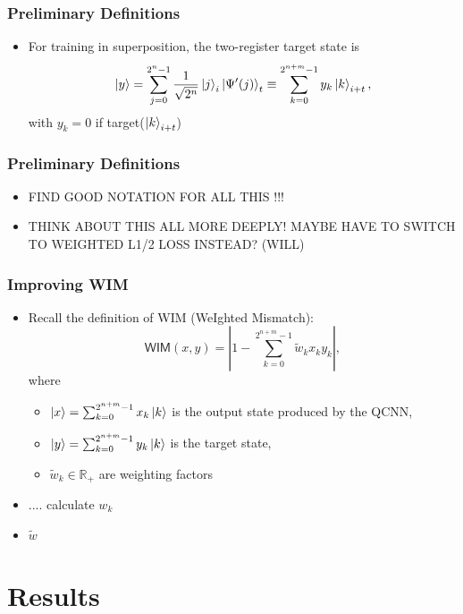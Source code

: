 \documentclass{beamer}
\begin{document}
\begin{frame}
\frametitle{Preliminary Definitions}
\begin{itemize}
\item For training in superposition, the two-register target state is 
\begin{equation}
\ket{y} = \sum_{j=0}^{2^n -1} \frac{1}{\sqrt{2^n}} \ket{j}_i \ket{\Psi'(j)}_t \equiv \sum_{k=0}^{2^{n+m}-1} y_k \ket{k}_{i+t}, 
\end{equation}
with $y_k =0$ if target($\ket{k}_{i+t}$)
\end{itemize}
\end{frame}

\begin{frame}
\frametitle{Preliminary Definitions}
\begin{itemize}
\item FIND GOOD NOTATION FOR ALL THIS !!!
\item THINK ABOUT THIS ALL MORE DEEPLY! MAYBE HAVE TO SWITCH TO WEIGHTED L1/2 LOSS INSTEAD? (WILL)
\end{itemize}
\end{frame}

\begin{frame}
\frametitle{Improving WIM}
\begin{itemize}
\item Recall the definition of \alert{WIM} (\alert{W}e\alert{I}ghted \alert{M}ismatch):
\begin{equation}
\mathsf{WIM}(x,y) =  \left\vert 1 - \sum_{k=0}^{2^{n+m}-1} \tilde{w}_k x_k y_k \right \vert, 
\end{equation}
where
\begin{itemize}
\item $\ket{x} = \sum_{k=0}^{2^{n+m}-1} x_k \ket{k} $ is the output state produced by the QCNN,
\item $\ket{y} = \sum_{k=0}^{2^{n+m}-1} y_k \ket{k} $ is the target state, 
\item $\tilde{w}_k \in \mathbb{R}_+$ are weighting factors 
\end{itemize}
\item .... calculate $w_k$
\item $\tilde{w}$
\end{itemize}
\end{frame}

\section{Results}
\end{document}
